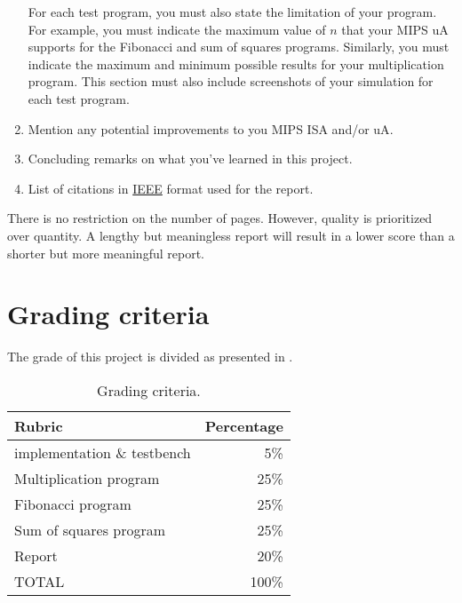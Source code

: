 \documentclass[number=03]{assignment}
\begin{document}
\begin{enumerate}
  For each test program, you must also state the limitation of your program. For example, you must indicate the maximum value of $n$ that your \ac{MIPS} \ac{uA} supports for the Fibonacci and sum of squares programs. Similarly, you must indicate the maximum and minimum possible results for your multiplication program.
  This section must also include screenshots of your \ModelSim simulation for each test program.
  
  \item {} Mention any potential improvements to you \ac{MIPS} \ac{ISA} and/or \ac{uA}.
  \item {} Concluding remarks on what you've learned in this project.
    \item {} List of citations in \href{http://journals.ieeeauthorcenter.ieee.org/wp-content/uploads/sites/7/IEEE-Reference-Guide.pdf}{IEEE} format used for the report.
\end{enumerate}

 There is no restriction on the number of pages. 
However, quality is prioritized over quantity. 
A lengthy but meaningless report will result in a lower score than a shorter but more meaningful report.

\section{Grading criteria}\label{sec:Grading}
The grade of this project is divided as presented in .
  \begin{table}[!htb]
    \centering
	\caption{Grading criteria.}
	\label{Table:Grading}
	\begin{tabular}{l|r}
	\hline
	  Rubric & Percentage \\
	  \hline\hline
	  \Jtype implementation  \& testbench & 5\% \\\hline
	  Multiplication program              & 25\% \\\hline
	  Fibonacci program                   & 25\% \\\hline
	  Sum of squares program              & 25\% \\\hline
	  Report                              & 20\% \\\hline\hline
	  TOTAL                               & 100\% \\  
	\end{tabular}
  \end{table}
 
\end{document}
